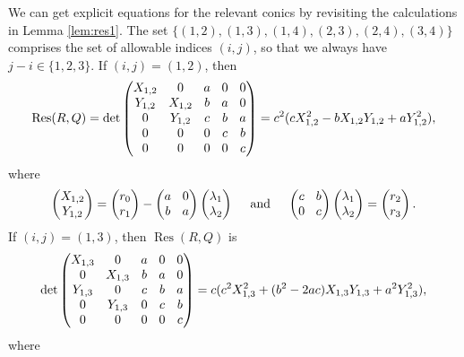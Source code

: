 \documentclass[11pt]{article}
\DeclareMathOperator{\Res}{Res}
\numberwithin{equation}{section}
\begin{document}
We can get explicit equations for the relevant conics by revisiting the calculations in
Lemma \ref{lem:res1}.
The set
$\{(1,2),(1,3),(1,4),(2,3),(2,4),(3,4)\}$ comprises the set of allowable indices $(i,j)$,
so that we always have $j-i\in\{1,2,3\}$.
If $(i,j)=(1,2)$, then
\[\arraycolsep4.5pt
\Res(R,Q)=
\det\begin{pmatrix}
X_{1,2} & 0 & a& 0& 0 \\
Y_{1,2} & X_{1,2}& b& a& 0 \\
0 & Y_{1,2}& c& b& a \\
0 & 0& 0& c& b \\
0 & 0& 0& 0& c
\end{pmatrix}=c^2 (c X_{1,2}^2- b X_{1,2} Y_{1,2} +a Y_{1,2}^2 ),
\]
where
\[\arraycolsep4.5pt
\begin{pmatrix}
X_{1,2}\\
Y_{1,2}\end{pmatrix}
=\begin{pmatrix}
r_0\\
r_1\end{pmatrix}
-\begin{pmatrix}
a & 0 \\
b & a
\end{pmatrix}\begin{pmatrix}
\lambda_1 \\
\lambda_2
\end{pmatrix}\quad\text{ and }\quad\begin{pmatrix}
c & b \\
0 & c
\end{pmatrix}\begin{pmatrix}
\lambda_1 \\
\lambda_2 \\
\end{pmatrix}=\begin{pmatrix}
r_2 \\
r_3
\end{pmatrix}.
\]
If $(i,j)=(1,3)$, then $\Res(R,Q)$ is
\[\arraycolsep4.5pt
\det\begin{pmatrix}
X_{1,3} & 0 & a& 0& 0 \\
0 & X_{1,3}& b& a& 0 \\
Y_{1,3} & 0& c& b& a \\
0 & Y_{1,3}& 0& c& b \\
0 & 0& 0& 0& c \\
\end{pmatrix}=c (c^2 X_{1,3}^2+(b^2- 2 a c) X_{1,3} Y_{1,3} +a^2 Y_{1,3}^2),
\]
where
\end{document}
